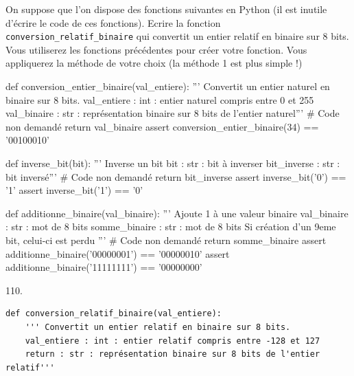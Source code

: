 \documentclass[a4paper,10pt]{report}
\def\ptsexoF{4}
\begin{document}
\medskip

\pagebreak
\thispagestyle{DS_LP}
\exods{\ptsexoF}

On suppose que l'on dispose des fonctions suivantes en Python (il est inutile d'écrire le code de ces fonctions). Ecrire la fonction \texttt{conversion\_relatif\_binaire} qui convertit un entier relatif en binaire sur 8 bits. Vous utiliserez les fonctions précédentes pour créer votre fonction. 
 Vous appliquerez la méthode de votre choix (la méthode 1 est plus simple !)


\begin{CodePythontexAlt}[TaillePolice=\large, Largeur=1\linewidth,Centre,PremLigne=1]{}
def conversion_entier_binaire(val_entiere):
    ''' Convertit un entier naturel en binaire sur 8 bits. 
    val_entiere : int : entier naturel compris entre 0 et 255
    val_binaire : str : représentation binaire sur 8 bits de l'entier naturel'''
    # Code non demandé
    return val_binaire    
assert conversion_entier_binaire(34) == '00100010'

def inverse_bit(bit):
    ''' Inverse un bit 
    bit : str : bit à inverser
    bit_inverse : str : bit inversé'''
    # Code non demandé
    return bit_inverse
assert inverse_bit('0') == '1'
assert inverse_bit('1') == '0'

def additionne_binaire(val_binaire):
    ''' Ajoute 1 à une valeur binaire 
    val_binaire : str : mot de 8 bits
    somme_binaire : str : mot de 8 bits 
    Si création d'un 9eme bit, celui-ci est perdu '''
    # Code non demandé
    return somme_binaire
assert additionne_binaire('00000001') == '00000010'
assert additionne_binaire('11111111') == '00000000'

\end{CodePythontexAlt}

  
    \begin{answer}{1}{10.}
    \begin{verbatim}
def conversion_relatif_binaire(val_entiere):
    ''' Convertit un entier relatif en binaire sur 8 bits. 
    val_entiere : int : entier relatif compris entre -128 et 127
    return : str : représentation binaire sur 8 bits de l'entier relatif'''
    \end{verbatim}
    \end{answer}
\end{document}
